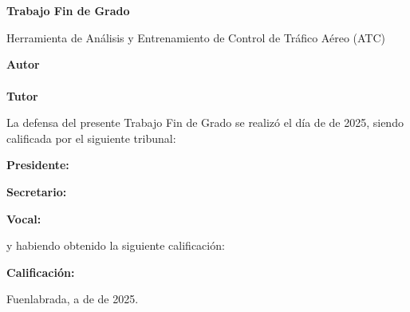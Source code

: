 \chapter*{}

\vspace{-4cm}
\begin{center}
\LARGE
\textbf{Trabajo Fin de Grado}

\vspace{1cm}
\large
Herramienta de Análisis y Entrenamiento de Control de Tráfico Aéreo (ATC)

\vspace{1cm}
\large
\textbf{Autor} \\
\docAuthor \\
\textbf{Tutor} \\
\tutor

\end{center}

\vspace{1cm}
La defensa del presente Trabajo Fin de Grado se realizó el día \hspace{1.2cm} de \hspace{3.0cm} \newline de 2025, siendo calificada por el siguiente tribunal:


\vspace{1.2cm}
\textbf{Presidente:}
	
\vspace{1.2cm}
\textbf{Secretario:}

\vspace{1.2cm}
\textbf{Vocal:}


\vspace{1.2cm}
y habiendo obtenido la siguiente calificación:

\vspace{1cm}
\textbf{Calificación:}


\vspace{1cm}
\vfill{
\begin{flushright}
Fuenlabrada, a \hspace{1.2cm} de \hspace{3.0cm} de 2025.
\end{flushright}
}